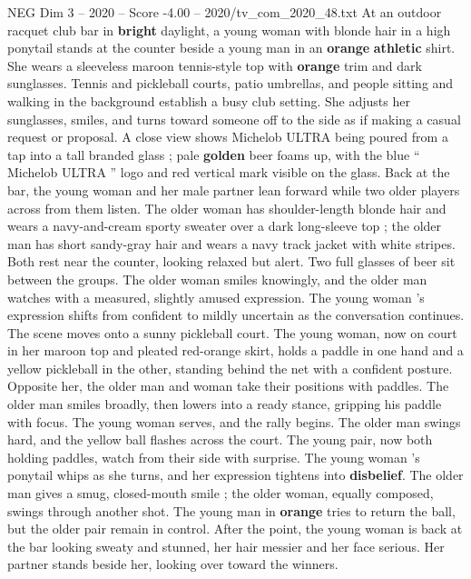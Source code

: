 \begin{textsample}{NEG Dim 3 – 2020 – Score -4.00 – 2020/tv\_com\_2020\_48.txt}  \label{ex:f3_neg_023}
At an outdoor racquet club bar in \textbf{bright} daylight, a young woman with blonde hair in a high ponytail stands at the counter beside a young man in an \textbf{orange} \textbf{athletic} shirt.
She wears a sleeveless maroon tennis-style top with \textbf{orange} trim and dark sunglasses.
Tennis and pickleball courts, patio umbrellas, and people sitting and walking in the background establish a busy club setting.
She adjusts her sunglasses, smiles, and turns toward someone off to the side as if making a casual request or proposal.
A close view shows Michelob ULTRA being poured from a tap into a tall branded glass ; pale \textbf{golden} beer foams up, with the blue “ Michelob ULTRA ” logo and red vertical mark visible on the glass.
Back at the bar, the young woman and her male partner lean forward while two older players across from them listen.
The older woman has shoulder-length blonde hair and wears a navy-and-cream sporty sweater over a dark long-sleeve top ; the older man has short sandy-gray hair and wears a navy track jacket with white stripes.
Both rest near the counter, looking relaxed but alert.
Two full glasses of beer sit between the groups.
The older woman smiles knowingly, and the older man watches with a measured, slightly amused expression.
The young woman ’s expression shifts from confident to mildly uncertain as the conversation continues.
The scene moves onto a sunny pickleball court.
The young woman, now on court in her maroon top and pleated red-orange skirt, holds a paddle in one hand and a yellow pickleball in the other, standing behind the net with a confident posture.
Opposite her, the older man and woman take their positions with paddles.
The older man smiles broadly, then lowers into a ready stance, gripping his paddle with focus.
The young woman serves, and the rally begins.
The older man swings hard, and the yellow ball flashes across the court.
The young pair, now both holding paddles, watch from their side with surprise.
The young woman ’s ponytail whips as she turns, and her expression tightens into \textbf{disbelief}.
The older man gives a smug, closed-mouth smile ; the older woman, equally composed, swings through another shot.
The young man in \textbf{orange} tries to return the ball, but the older pair remain in control.
After the point, the young woman is back at the bar looking sweaty and stunned, her hair messier and her face serious.
Her partner stands beside her, looking over toward the winners.

\end{textsample}
